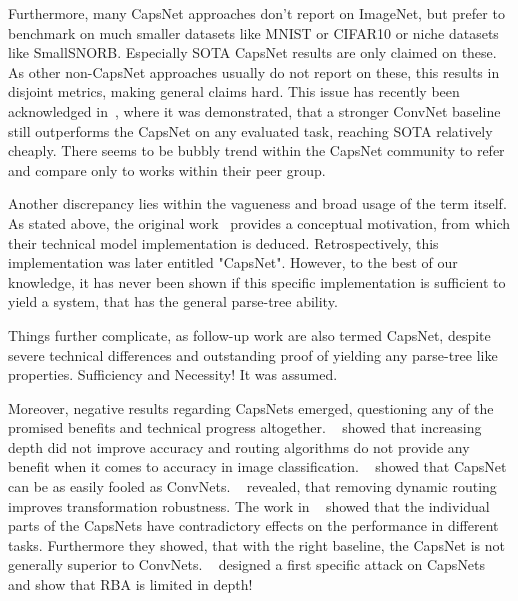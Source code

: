 \documentclass{article}
\begin{document}
Furthermore, many CapsNet approaches don't report on ImageNet, but prefer to benchmark on much smaller datasets like MNIST or CIFAR10 or niche datasets like SmallSNORB. %
Especially SOTA CapsNet results are only claimed on these. %
As other non-CapsNet approaches usually do not report on these, this results in disjoint metrics, making general claims hard.
This issue has recently been acknowledged in~\cite{cvpr/GuT021}, where it was demonstrated, that a stronger ConvNet baseline still outperforms the CapsNet on any evaluated task, reaching SOTA relatively cheaply.
There seems to be bubbly trend within the CapsNet community to refer and compare only to works within their peer group.

Another discrepancy lies within the vagueness and broad usage of the term itself. As stated above, the original work~\cite{nips/SabourFH17} provides a conceptual motivation, from which their technical model implementation is deduced. Retrospectively, this implementation was later entitled "CapsNet". However, to the best of our knowledge, it has never been shown if this specific implementation is sufficient to yield a system, that has the general parse-tree ability.

Things further complicate, as follow-up work are also termed CapsNet, despite severe technical differences and outstanding proof of yielding any parse-tree like properties. Sufficiency and Necessity! It was assumed.

Moreover, negative results regarding CapsNets emerged, questioning any of the promised benefits and technical progress altogether.
~\cite{acml/PaikKK19} showed that increasing depth did not improve accuracy and routing algorithms do not provide any benefit when it comes to accuracy in image classification.
~\cite{corr/michels2019} showed that CapsNet can be as easily fooled as ConvNets.
~\cite{ieee/Gu2020} revealed, that removing dynamic routing improves transformation robustness.
The work in ~\cite{cvpr/GuT021} showed that the individual parts of the CapsNets have contradictory effects on the performance in different tasks. Furthermore they showed, that with the right baseline, the CapsNet is not generally superior to ConvNets.
~\cite{iclr/Gu2021} designed a first specific attack on CapsNets and
\cite{prl/PeerSR21} show that RBA is limited in depth!
\end{document}
